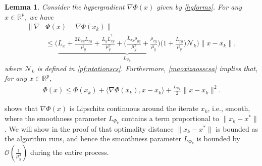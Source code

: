 \documentclass{osudissert96}
\newtheorem{lemma}{Lemma}
\begin{document}
\begin{lemma}\label{smoothness_Phis}
Consider the hypergradient $\nabla \Phi(x)$ given by \cref{hgforms}. For any $x\in\mathbb{R}^p$, we have
\begin{align}\label{maoxizaosscsa}
\|\nabla &\Phi(x)  - \nabla \Phi(x_k)\| \nonumber
\\&\leq \Big(\underbrace{ L_x+\frac{2L_{xy}\widetilde L_{xy}}{\mu_y} + \frac{L_y\widetilde L^2_{xy}}{\mu_y^2}+\Big(\frac{\widetilde L_{xy} \rho_{yy}}{\mu_y^2} +  \frac{\rho_{xy}}{\mu_y}\Big) \Big( 1+\frac{\widetilde L_{xy}}{\mu_y}  \Big)\mathcal{N}_k}_{L_{\Phi_k}}\Big)\|x-x_k\|, \end{align}
where $\mathcal{N}_k$ is defined in \cref{pf:ntationscs}. Furthermore, \cref{maoxizaosscsa} implies that, for any $x\in\mathbb{R}^p$,  
\begin{align}
\Phi(x)\leq \Phi(x_k)+\langle \nabla \Phi(x_k),x-x_k\rangle +  \frac{L_{\Phi_k}}{2}\|x-x_k\|^2.
\end{align}
\end{lemma}
 shows that $\nabla\Phi(x)$ is Lipschitz continuous around the iterate $x_k$, i.e., smooth, where the smoothness parameter $L_{\Phi_k}$ contains a term proportional to $\|x_k-x^*\|$. 
We will show in the proof of  that optimality distance $\|x_k-x^*\|$ is bounded as the algorithm runs, and hence the smoothness parameter $L_{\Phi_k}$ is bounded by $\mathcal{O}(\frac{1}{\mu_y^3})$ during the entire process. %
\end{document}
